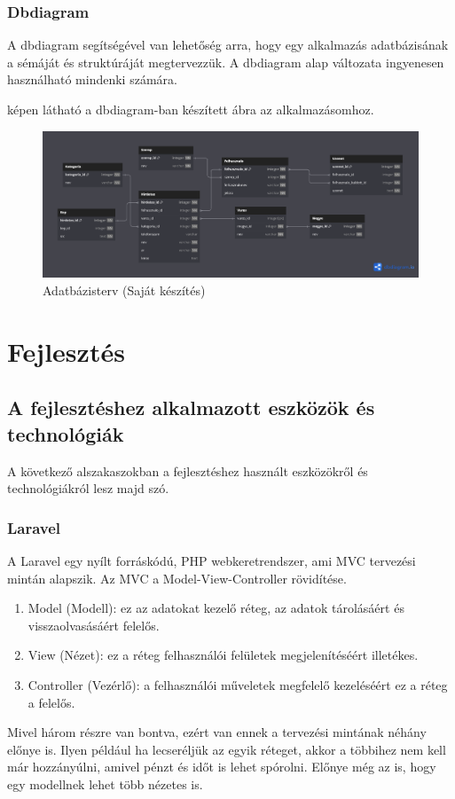 \documentclass[]{thesis-ekf}
\theoremstyle{definition}
\theoremstyle{remark}
\begin{document}
	\subsection{Dbdiagram}
	A dbdiagram segítségével van lehetőség arra, hogy egy alkalmazás adatbázisának a sémáját és struktúráját megtervezzük. A dbdiagram alap változata ingyenesen használható mindenki számára.
	
	 képen látható a dbdiagram-ban készített ábra az alkalmazásomhoz.
	
	\begin{figure}[ht!]
		\centering
		\includegraphics[width=20cm]{./tervezes/dbdiagram}
		\caption{Adatbázisterv (Saját készítés)} 
		\label{dbdiagram}
	\end{figure}

	\chapter{Fejlesztés}		
	\section{A fejlesztéshez alkalmazott eszközök és technológiák}
		A következő alszakaszokban a fejlesztéshez használt eszközökről és technológiákról lesz majd szó.
	\subsection{Laravel}
		A Laravel egy nyílt forráskódú, PHP webkeretrendszer, ami MVC tervezési mintán alapszik. Az MVC a Model-View-Controller rövidítése.
		\begin{enumerate}
			\item Model (Modell): ez az adatokat kezelő réteg, az adatok tárolásáért és visszaolvasásáért felelős.
			\item View (Nézet): ez a réteg felhasználói felületek megjelenítéséért illetékes. 
			\item Controller (Vezérlő): a felhasználói műveletek megfelelő kezeléséért ez a réteg a felelős.
		\end{enumerate}
		Mivel három részre van bontva, ezért van ennek a tervezési mintának néhány előnye is. Ilyen például ha lecseréljük az egyik réteget, akkor a többihez nem kell már hozzányúlni, amivel pénzt és időt is lehet spórolni. Előnye még az is, hogy egy modellnek lehet több nézetes is.
		\cite[102-103.~oldal]{Kusper}
\end{document}
